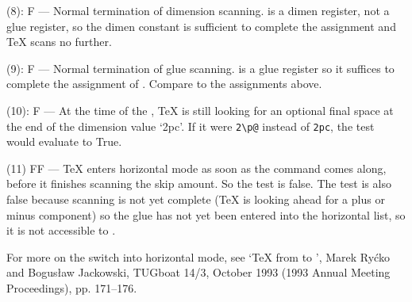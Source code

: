\begin{lcode}
\end{lcode}
(8): F --- Normal termination of dimension scanning. \cmd{\lineskiplimit}
is a dimen register, not a glue register, so the dimen constant \cmd{\z@} is
sufficient to complete the assignment and TeX scans no further.

\begin{lcode}
\end{lcode}
(9): F --- Normal termination of glue scanning. \cmd{\z@skip} is a glue
register so it suffices to complete the assignment of \cmd{\lineskip}. Compare
to the \cmd{\tabskip} assignments above.

\begin{lcode}
\end{lcode}
(10): F --- At the time of the , TeX is still looking for
an optional final space at the end of the dimension value `2pc'. If it
were \verb?2\p@? instead of \verb?2pc?, the test would evaluate to True.

\begin{lcode}
\end{lcode}
(11) FF --- TeX enters horizontal mode as soon as the \cmd{\hskip} command
comes along, before it finishes scanning the skip amount. So the
 test is false. The  test is also false because scanning
is not yet complete (TeX is looking ahead for a plus or minus component)
so the glue has not yet been entered into the horizontal list, so it is
not accessible to \cmd{\lastskip}.

For more on the switch into horizontal mode, see `TeX from \cmd{\indent} to
', Marek Ry{\'c}ko and Bogus{\l}aw Jackowski, TUGboat 14/3, October
1993 (1993 Annual Meeting Proceedings), pp. 171--176.

